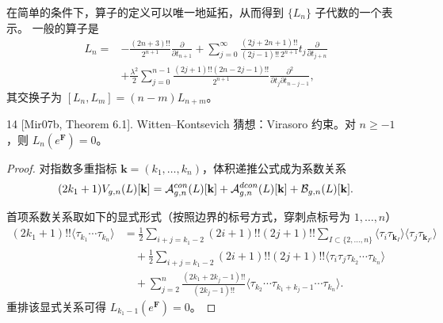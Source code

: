 
在简单的条件下，算子的定义可以唯一地延拓，从而得到 $\{L_n\}$ 子代数的一个表示。
一般的算子是
\[
\begin{aligned}
L_n={}&-\frac{(2n+3)!!}{2^{n+1}}\frac{\partial}{\partial t_{n+1}}
+\sum_{j=0}^{\infty}\frac{(2j+2n+1)!!}{(2j-1)!!\,2^{n+1}}t_j
\frac{\partial}{\partial t_{j+n}}\\
&+\frac{\lambda^2}{2}\sum_{j=0}^{n-1}\frac{(2j+1)!!(2n-2j-1)!!}{2^{n+1}}
\frac{\partial^2}{\partial t_j\partial t_{n-j-1}},
\end{aligned}
\]
其交换子为 $[L_n,L_m]=(n-m)L_{n+m}$。

\begin{thm}{14}
[Mir07b, Theorem 6.1]. Witten--Kontsevich 猜想：Virasoro 约束。对 $n\ge -1$，则
$L_n(e^{\mathbf F})=0$。
\end{thm}

\begin{proof}
对指数多重指标 $\mathbf k=(k_1,\dots,k_n)$，体积递推公式成为系数关系
\[
(2k_1+1)V_{g,n}(L)[\mathbf k]
=\mathcal{A}^{con}_{g,n}(L)[\mathbf k]+\mathcal{A}^{dcon}_{g,n}(L)[\mathbf k]+\mathcal{B}_{g,n}(L)[\mathbf k].
\]

首项系数关系取如下的显式形式（按照边界的标号方式，穿刺点标号为 $1,\dots,n$）
\[
\begin{aligned}
(2k_1+1)!!\langle\tau_{k_1}\cdots\tau_{k_n}\rangle
&=\frac12\sum_{i+j=k_1-2}(2i+1)!!(2j+1)!!
\sum_{I\subset\{2,\dots,n\}}\langle\tau_i\tau_{\mathbf k_I}\rangle
\langle\tau_j\tau_{\mathbf k_{I^c}}\rangle\\
&\quad+\frac12\sum_{i+j=k_1-2}(2i+1)!!(2j+1)!!
\langle\tau_i\tau_j\tau_{k_2}\cdots\tau_{k_n}\rangle\\
&\quad+\sum_{j=2}^{n}\frac{(2k_1+2k_j-1)!!}{(2k_j-1)!!}
\langle\tau_{k_2}\cdots\tau_{k_1+k_j-1}\cdots\tau_{k_n}\rangle.
\end{aligned}
\]
重排该显式关系可得 $L_{k_1-1}(e^{\mathbf F})=0$。
\end{proof}


